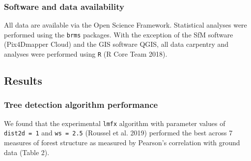 \documentclass[]{article}
\begin{document}
\hypertarget{software-and-data-availability}{%
\subsubsection{Software and data
availability}\label{software-and-data-availability}}

All data are available via the Open Science Framework. Statistical
analyses were performed using the \texttt{brms} packages. With the
exception of the SfM software (Pix4Dmapper Cloud) and the GIS software
QGIS, all data carpentry and analyses were performed using \texttt{R} (R
Core Team 2018).

\hypertarget{results}{%
\subsection{Results}\label{results}}

\hypertarget{tree-detection-algorithm-performance}{%
\subsubsection{Tree detection algorithm
performance}\label{tree-detection-algorithm-performance}}

We found that the experimental \texttt{lmfx} algorithm with parameter
values of \texttt{dist2d\ =\ 1} and \texttt{ws\ =\ 2.5} (Roussel et al.
2019) performed the best across 7 measures of forest structure as
measured by Pearson's correlation with ground data (Table 2).
\end{document}
